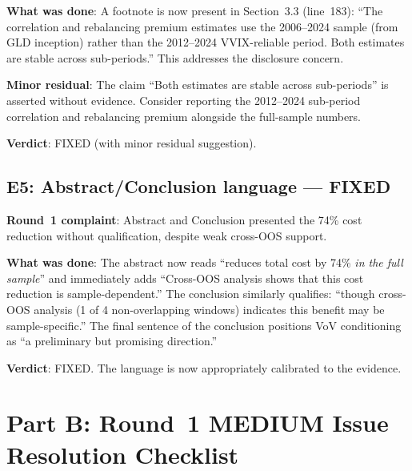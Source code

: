 \documentclass[12pt,a4paper]{article}
\begin{document}
\textbf{What was done}: A footnote is now present in Section~3.3 (line~183): ``The correlation and rebalancing premium estimates use the 2006--2024 sample (from GLD inception) rather than the 2012--2024 VVIX-reliable period. Both estimates are stable across sub-periods.'' This addresses the disclosure concern.

\textbf{Minor residual}: The claim ``Both estimates are stable across sub-periods'' is asserted without evidence. Consider reporting the 2012--2024 sub-period correlation and rebalancing premium alongside the full-sample numbers.

\textbf{Verdict}: \textcolor{okgreen}{FIXED} (with minor residual suggestion).

\bigskip

\subsection*{\textcolor{fixedblue}{E5: Abstract/Conclusion language --- FIXED}}

\textbf{Round~1 complaint}: Abstract and Conclusion presented the 74\% cost reduction without qualification, despite weak cross-OOS support.

\textbf{What was done}: The abstract now reads ``reduces total cost by 74\% \emph{in the full sample}'' and immediately adds ``Cross-OOS analysis shows that this cost reduction is sample-dependent.'' The conclusion similarly qualifies: ``though cross-OOS analysis (1 of 4 non-overlapping windows) indicates this benefit may be sample-specific.'' The final sentence of the conclusion positions VoV conditioning as ``a preliminary but promising direction.''

\textbf{Verdict}: \textcolor{okgreen}{FIXED.} The language is now appropriately calibrated to the evidence.

\section*{Part B: Round~1 MEDIUM Issue Resolution Checklist}
\end{document}
